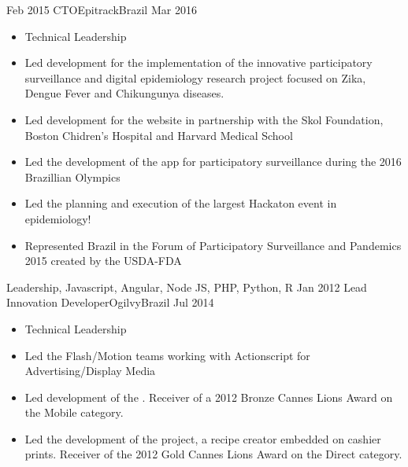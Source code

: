 \begin{experiences}
  \emptySeparator
  \experience
    {Feb 2015}     {CTO}{Epitrack}{Brazil}
    {Mar 2016}    {
                      \begin{itemize}
                        \item Technical Leadership
                        \item Led development for the implementation of the innovative participatory surveillance and digital epidemiology research project focused on Zika, Dengue Fever and Chikungunya diseases.
                        \item Led development for the  website in partnership with the Skol Foundation, Boston Chidren's Hospital and Harvard Medical School
                        \item Led the development of the  app for participatory surveillance during the 2016 Brazillian Olympics
                        \item Led the planning and execution of  the largest Hackaton event in epidemiology!
                        \item Represented Brazil in the Forum of Participatory Surveillance and Pandemics 2015 created by the USDA-FDA
                      \end{itemize}
                    }
                    {Leadership, Javascript, Angular, Node JS, PHP, Python, R}
  \emptySeparator
  \experience
    {Jan 2012}     {Lead Innovation Developer}{Ogilvy}{Brazil}
    {Jul 2014}    {
                      \begin{itemize}
                        \item Technical Leadership
                        \item Led the Flash/Motion teams working with Actionscript for Advertising/Display Media
                        \item Led development of the . Receiver of a 2012 Bronze Cannes Lions Award on the Mobile category.
                        \item Led the development of the  project, a recipe creator embedded on cashier prints. Receiver of the 2012 Gold Cannes Lions Award on the Direct category.

\end{itemize}}
\end{experiences}
